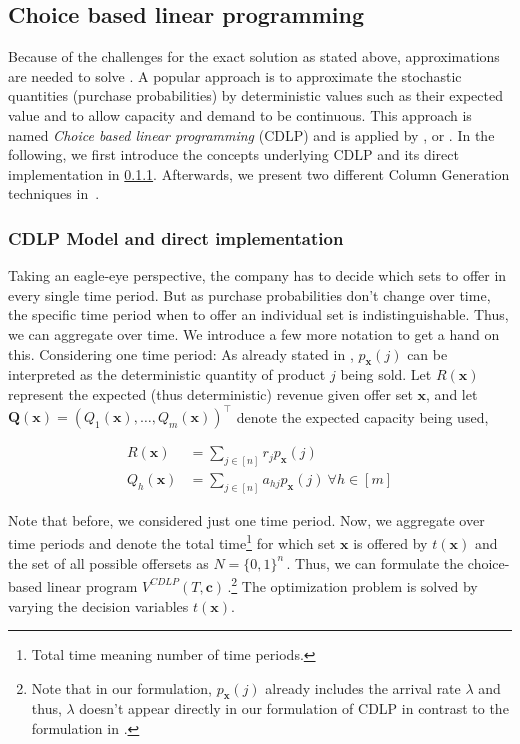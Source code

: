 \subsection{Choice based linear programming}\label{ss:cdlp}

Because of the challenges for the exact solution as stated above, approximations are needed to solve . A popular approach is to approximate the stochastic quantities (purchase probabilities) by deterministic values such as their expected value and to allow capacity and demand to be continuous. This approach is named \emph{Choice based linear programming} (CDLP) and is applied by \eg \cite{GGallego.}, \cite{Liu.2008} or \cite{Bront.2009}. In the following, we first introduce the concepts underlying CDLP and its direct implementation in \cref{ss:cdlp1}. Afterwards, we present two different Column Generation techniques in \,.

\subsubsection{CDLP Model and direct implementation}\label{ss:cdlp1}

Taking an eagle-eye perspective, the company has to decide which sets to offer in every single time period. But as purchase probabilities don't change over time, the specific time period when to offer an individual set is indistinguishable. Thus, we can aggregate over time. We introduce a few more notation to get a hand on this. Considering one time period: As already stated in , $p_{\boldsymbol{x}}(j)$ can be interpreted as the deterministic quantity of product $j$ being sold. Let $R(\boldsymbol{x})$ represent the expected (thus deterministic) revenue given offer set $\boldsymbol{x}$, and let $\boldsymbol{Q}(\boldsymbol{x}) = (Q_1(\boldsymbol{x}), \dots, Q_m(\boldsymbol{x}))^\intercal$ denote the expected capacity being used, \ie

\begin{align}
R(\boldsymbol{x}) &= \sum_{j \in [n]} r_j p_{\boldsymbol{x}}(j)\\
Q_h(\boldsymbol{x}) &= \sum_{j \in [n]} a_{hj} p_{\boldsymbol{x}}(j) ~\forall h \in [m]
\end{align}

Note that before, we considered just one time period. Now, we aggregate over time periods and denote the total time\footnote{Total time meaning number of time periods.} for which set $\boldsymbol{x}$ is offered by $t(\boldsymbol{x})$ and the set of all possible offersets as $N = \{0,1\}^n$\,. Thus, we can formulate the choice-based linear program $V^{CDLP}(T, \boldsymbol{c})$\,.\footnote{Note that in our formulation, $p_{\boldsymbol{x}}(j)$ already includes the arrival rate $\lambda$ and thus, $\lambda$ doesn't appear directly in our formulation of CDLP in contrast to the formulation in \cite{Bront.2009}.} The optimization problem is solved by varying the decision variables $t(\boldsymbol{x})$. 

